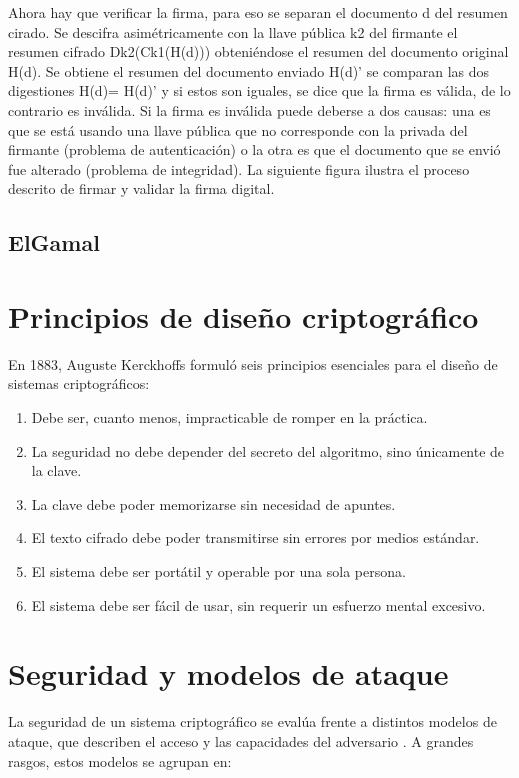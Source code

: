 Ahora hay que verificar la firma, para eso se separan el documento d del resumen cirado. Se descifra
asimétricamente con la llave pública k2 del firmante el resumen cifrado Dk2(Ck1(H(d))) obteniéndose el
resumen del documento original H(d). Se obtiene el resumen del documento enviado H(d)’ se comparan
las dos digestiones H(d)= H(d)’ y si estos son iguales, se dice que la firma es válida, de lo contrario es
inválida. Si la firma es inválida puede deberse a dos causas: una es que se está usando una llave pública
que no corresponde con la privada del firmante (problema de autenticación) o la otra es que el documento
que se envió fue alterado (problema de integridad). La siguiente figura ilustra el proceso descrito de firmar
y validar la firma digital.
\subsection{ElGamal}\label{sec:elgamal}

\section{Principios de diseño criptográfico}

En 1883, Auguste Kerckhoffs formuló seis principios esenciales para el diseño de sistemas criptográficos:

\begin{enumerate}
  \item Debe ser, cuanto menos, impracticable de romper en la práctica.
  \item La seguridad no debe depender del secreto del algoritmo, sino únicamente de la clave.
  \item La clave debe poder memorizarse sin necesidad de apuntes.
  \item El texto cifrado debe poder transmitirse sin errores por medios estándar.
  \item El sistema debe ser portátil y operable por una sola persona.
  \item El sistema debe ser fácil de usar, sin requerir un esfuerzo mental excesivo.
\end{enumerate}
\section{Seguridad y modelos de ataque}

La seguridad de un sistema criptográfico se evalúa frente a distintos modelos de ataque, que describen el acceso y las capacidades del adversario \cite{turn1search3}. A grandes rasgos, estos modelos se agrupan en:

